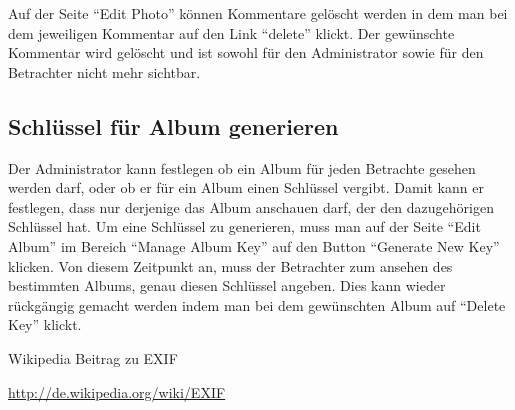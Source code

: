 \documentclass[a4paper,12pt,liststotocnumbered]{scrartcl}
\begin{document}
Auf der Seite "`Edit Photo"' können Kommentare gelöscht werden in dem
man bei dem jeweiligen Kommentar auf den Link "`delete"' klickt. Der
gewünschte Kommentar wird gelöscht und ist sowohl für den Administrator
sowie für den Betrachter nicht mehr sichtbar.

\subsection{Schlüssel für Album generieren}

Der Administrator kann festlegen ob ein Album für jeden Betrachte
gesehen werden darf, oder ob er für ein Album einen Schlüssel vergibt.
Damit kann er festlegen, dass nur derjenige das Album anschauen darf,
der den dazugehörigen Schlüssel hat. Um eine Schlüssel zu generieren,
muss man auf der Seite "`Edit Album"' im Bereich "`Manage Album Key"'
auf den Button "`Generate New Key"' klicken. Von diesem Zeitpunkt an,
muss der Betrachter zum ansehen des bestimmten Albums, genau diesen
Schlüssel angeben. Dies kann wieder rückgängig gemacht werden indem man
bei dem gewünschten Album auf "`Delete Key"' klickt.

\newpage
{}
\begin{thebibliography}{}
	 Wikipedia Beitrag zu EXIF

		\url{http://de.wikipedia.org/wiki/EXIF}
\end{thebibliography}
\end{document}

